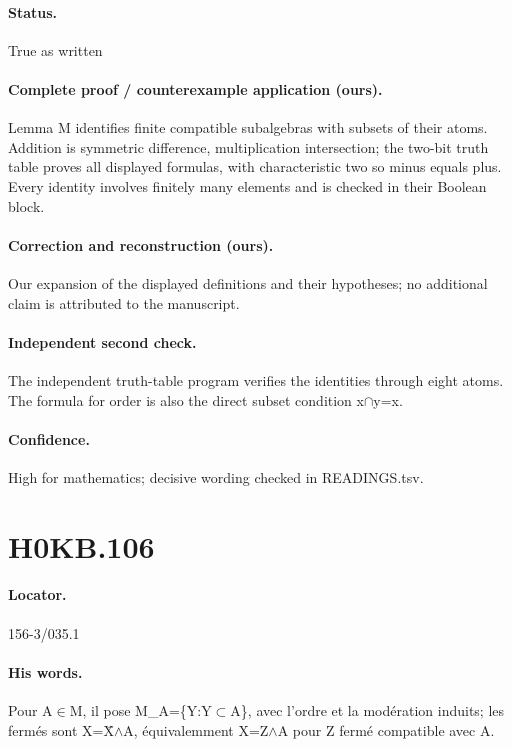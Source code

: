 \paragraph{Status.} True as written

\paragraph{Complete proof / counterexample application (ours).} Lemma M identifies finite compatible subalgebras with subsets of their atoms. Addition is symmetric difference, multiplication intersection; the two-bit truth table proves all displayed formulas, with characteristic two so minus equals plus. Every identity involves finitely many elements and is checked in their Boolean block.

\paragraph{Correction and reconstruction (ours).} Our expansion of the displayed definitions and their hypotheses; no additional claim is attributed to the manuscript.

\paragraph{Independent second check.} The independent truth-table program verifies the identities through eight atoms. The formula for order is also the direct subset condition x\ensuremath{\cap}y=x.

\paragraph{Confidence.} High for mathematics; decisive wording checked in READINGS.tsv.

\section*{H0KB.106}\label{statement:H0KB.106}
\paragraph{Locator.} 156-3/035.1

\paragraph{His words.} Pour A\ensuremath{\in}M, il pose M\_A=\{Y:Y\ensuremath{\subset}A\}, avec l’ordre et la modération induits; les fermés sont X=X̄\ensuremath{\wedge}A, équivalemment X=Z\ensuremath{\wedge}A pour Z fermé compatible avec A.

